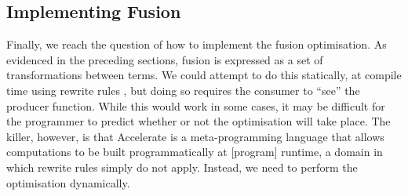 \subsection{Implementing Fusion}

% 
% 
% 


Finally, we reach the question of how to implement the fusion optimisation. As
evidenced in the preceding sections,
fusion is expressed as a set of transformations between terms. We could attempt
to do this statically, at compile time using rewrite rules \cite{Jones:2001wm},
but doing so requires the consumer to ``see'' the producer function. While this
would work in some cases, it may be difficult for the programmer to predict
whether or not the optimisation will take place. The killer, however, is that
Accelerate is a meta-programming language that allows computations to be built
programmatically at [program] runtime, a domain in which rewrite rules simply do
not apply. Instead, we need to perform the optimisation dynamically.

